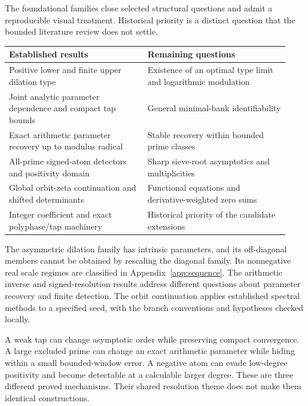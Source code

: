 The foundational families close selected structural questions and admit a reproducible visual treatment. Historical priority is a distinct question that the bounded literature review does not settle.

\begin{tabular}{@{}>{\raggedright\arraybackslash}P{0.46\linewidth}>{\raggedright\arraybackslash}P{0.47\linewidth}@{}}
\toprule
Established results & Remaining questions\\\midrule
Positive lower and finite upper dilation type & Existence of an optimal type limit and logarithmic modulation\\
Joint analytic parameter dependence and compact tap bounds & General minimal-bank identifiability\\
Exact arithmetic parameter recovery up to modulus radical & Stable recovery within bounded prime classes\\
All-prime signed-atom detectors and positivity domain & Sharp sieve-root asymptotics and multiplicities\\
Global orbit-zeta continuation and shifted determinants & Functional equations and derivative-weighted zero sums\\
Integer coefficient and exact polyphase/tap machinery & Historical priority of the candidate extensions\\
\bottomrule\end{tabular}

The asymmetric dilation family has intrinsic parameters, and its off-diagonal
members cannot be obtained by rescaling the diagonal family. Its nonnegative
real scale regimes are classified in Appendix~\ref{app:sequence}.
The arithmetic inverse and signed-resolution results address different
questions about parameter recovery and finite detection. The orbit
continuation applies established spectral methods to a specified seed,
with the branch conventions and hypotheses checked locally.

A weak tap can change asymptotic order while preserving compact convergence.
A large excluded prime can change an exact arithmetic parameter while hiding
within a small bounded-window error. A negative atom can evade low-degree
positivity and become detectable at a calculable larger degree.
These are three different proved mechanisms. Their shared resolution theme
does not make them identical constructions.

